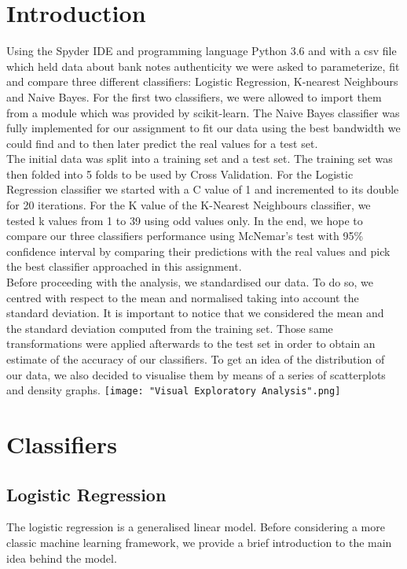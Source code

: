 \documentclass[a4paper]{article}
\begin{document}
\section{Introduction}
Using the Spyder IDE and programming language Python 3.6 and with a csv file which held data about bank notes authenticity 
we were asked to parameterize, fit and compare three different classifiers: Logistic Regression, K-nearest Neighbours and Naive Bayes. 
For the first two classifiers, we were allowed to import them from a module which was provided by scikit-learn. 
The Naive Bayes classifier was fully implemented for our assignment to fit our data using the best bandwidth we could find and to then later predict the real values
for a test set.\\
The initial data was split into a training set and a test set. The training set was then folded into 5 folds to be used by Cross Validation.
For the Logistic Regression classifier we started with a C value of 1 and incremented to its double for 20 iterations.
For the K value of the K-Nearest Neighbours classifier, we tested k values from 1 to 39 using odd values only. 
In the end, we hope to compare our three classifiers performance using McNemar's test with 95\%  confidence interval 
by comparing their predictions with the real values and pick the best classifier approached in this assignment.\\
Before proceeding with the analysis, we standardised our data. To do so, we centred with respect to the mean and normalised taking into account the standard deviation. It is important to notice that we considered the mean and the standard deviation computed from the training set. Those same transformations were applied afterwards to the test set in order to obtain an estimate of the accuracy of our classifiers. To get an idea of the distribution of our data, we also decided to visualise them by means of a series of scatterplots and density graphs. \texttt{[image: "Visual Exploratory Analysis".png]}

\section{Classifiers}

\subsection{Logistic Regression}

The logistic regression is a generalised linear model. Before considering
a more classic machine learning framework, we provide a brief introduction
to the main idea behind the model. 
\end{document}
